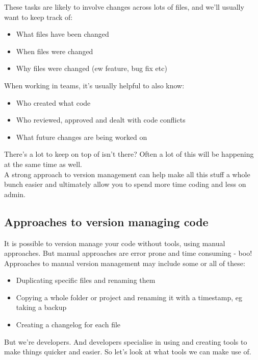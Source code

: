 These tasks are likely to involve changes across lots of files, and we'll usually want to keep track of:

\begin{itemize}
    \item What files have been changed
    \item When files were changed
    \item Why files were changed (ew feature, bug fix etc)
\end{itemize}

When working in teams, it's usually helpful to also know:

\begin{itemize}
    \item Who created what code
    \item Who reviewed, approved and dealt with code conflicts
    \item What future changes are being worked on
\end{itemize}

There's a lot to keep on top of isn't there? Often a lot of this will be happening at the same time as well.
\\

A strong approach to version management can help make all this stuff a whole bunch easier and ultimately allow you to spend more time coding and less on admin.

\subsection{Approaches to version managing code}

It is possible to version manage your code without tools, using manual approaches. But manual approaches are error prone and time consuming - boo!
\\ 

Approaches to manual version management may include some or all of these:

\begin{itemize}
    \item Duplicating specific files and renaming them
    \item Copying a whole folder or project and renaming it with a timestamp, eg taking a backup
    \item Creating a changelog for each file
\end{itemize}

But we're developers. And developers specialise in using and creating tools to make things quicker and easier. So let's look at what tools we can make use of. 



